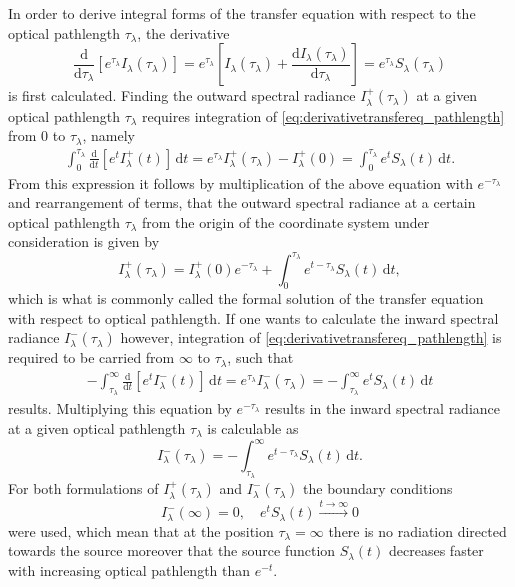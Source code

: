 \documentclass[a4paper,12pt]{report}
\begin{document}
In order to derive integral forms of the transfer equation with respect to the optical pathlength $\tau_\lambda$, the derivative \begin{equation}\label{eq:derivativetransfereq_pathlength}
\frac{\mathrm{d}}{\mathrm{d}\tau_\lambda}\left[e^{\tau_\lambda}I_\lambda(\tau_\lambda)\right] = e^{\tau_\lambda}\left[I_\lambda(\tau_\lambda) + \frac{\mathrm{d}I_\lambda(\tau_\lambda)}{\mathrm{d}\tau_\lambda}\right] = e^{\tau_\lambda}S_\lambda(\tau_\lambda)
\end{equation} is first calculated. Finding the outward spectral radiance $I^+_\lambda(\tau_\lambda)$ at a given optical pathlength $\tau_\lambda$ requires integration of \cref{eq:derivativetransfereq_pathlength} from $0$ to $\tau_\lambda$, namely \begin{gather}
\int_{0}^{\tau_\lambda} \frac{\mathrm{d}}{\mathrm{d}t}\left[e^{t}I^+_\lambda(t)\right]\,\mathrm{d}t = e^{\tau_\lambda}I^+_\lambda(\tau_\lambda) - I^+_\lambda(0) = \int_{0}^{\tau_\lambda}e^t S_\lambda(t)\,\mathrm{d}t.
\end{gather} From this expression it follows by multiplication of the above equation with $e^{-\tau_\lambda}$ and rearrangement of terms, that the outward spectral radiance at a certain optical pathlength $\tau_\lambda$ from the origin of the coordinate system under consideration is given by \begin{equation}\label{eq:formaltransferequationoutward_pathlength}
I^+_\lambda(\tau_\lambda) = I^+_\lambda(0)e^{-\tau_\lambda} + \int_{0}^{\tau_\lambda} e^{t-\tau_\lambda}S_\lambda(t)\,\mathrm{d}t,
\end{equation} which is what is commonly called the formal solution of the transfer equation with respect to optical pathlength. If one wants to calculate the inward spectral radiance $I^-_\lambda(\tau_\lambda)$ however, integration of \cref{eq:derivativetransfereq_pathlength} is required to be carried from $\infty$ to $\tau_\lambda$, such that \begin{gather}
-\int_{\tau_\lambda}^{\infty} \frac{\mathrm{d}}{\mathrm{d}t}\left[e^{t}I^-_\lambda(t)\right]\,\mathrm{d}t = e^{\tau_\lambda}I_\lambda^-(\tau_\lambda) = -\int_{\tau_\lambda}^{\infty}e^t S_\lambda(t)\,\mathrm{d}t
\end{gather} results. Multiplying this equation by $e^{-\tau_\lambda}$ results in the inward spectral radiance at a given optical pathlength $\tau_\lambda$ is calculable as \begin{equation}\label{eq:formaltransferequationinward_pathlength}
I^-_\lambda(\tau_\lambda) = -\int_{\tau_\lambda}^{\infty}e^{t-\tau_\lambda}S_\lambda(t)\,\mathrm{d}t.
\end{equation} For both formulations of $I_\lambda^+(\tau_\lambda)$ and $I_\lambda^-(\tau_\lambda)$ the boundary conditions \begin{equation}
I_\lambda^-(\infty) = 0, \quad e^tS_\lambda(t) \xrightarrow{t\rightarrow \infty} 0
\end{equation} were used, which mean that at the position $\tau_\lambda = \infty$ there is no radiation directed towards the source moreover that the source function $S_\lambda(t)$ decreases faster with increasing optical pathlength than $e^{-t}$.
\end{document}
